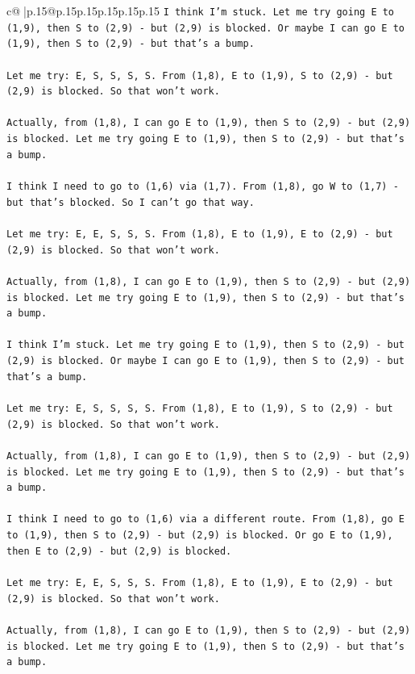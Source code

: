 \documentclass{article}
\begin{document}
{\begin{supertabular}{c@{$\;$}|p{.15\linewidth}@{}p{.15\linewidth}p{.15\linewidth}p{.15\linewidth}p{.15\linewidth}p{.15\linewidth}}
{{{\texttt{I think I'm stuck. Let me try going E to (1,9), then S to (2,9) {-} but (2,9) is blocked. Or maybe I can go E to (1,9), then S to (2,9) {-} but that's a bump.} \\
\\ 
\texttt{Let me try: E, S, S, S, S. From (1,8), E to (1,9), S to (2,9) {-} but (2,9) is blocked. So that won't work.} \\
\\ 
\texttt{Actually, from (1,8), I can go E to (1,9), then S to (2,9) {-} but (2,9) is blocked. Let me try going E to (1,9), then S to (2,9) {-} but that's a bump.} \\
\\ 
\texttt{I think I need to go to (1,6) via (1,7). From (1,8), go W to (1,7) {-} but that's blocked. So I can't go that way.} \\
\\ 
\texttt{Let me try: E, E, S, S, S. From (1,8), E to (1,9), E to (2,9) {-} but (2,9) is blocked. So that won't work.} \\
\\ 
\texttt{Actually, from (1,8), I can go E to (1,9), then S to (2,9) {-} but (2,9) is blocked. Let me try going E to (1,9), then S to (2,9) {-} but that's a bump.} \\
\\ 
\texttt{I think I'm stuck. Let me try going E to (1,9), then S to (2,9) {-} but (2,9) is blocked. Or maybe I can go E to (1,9), then S to (2,9) {-} but that's a bump.} \\
\\ 
\texttt{Let me try: E, S, S, S, S. From (1,8), E to (1,9), S to (2,9) {-} but (2,9) is blocked. So that won't work.} \\
\\ 
\texttt{Actually, from (1,8), I can go E to (1,9), then S to (2,9) {-} but (2,9) is blocked. Let me try going E to (1,9), then S to (2,9) {-} but that's a bump.} \\
\\ 
\texttt{I think I need to go to (1,6) via a different route. From (1,8), go E to (1,9), then S to (2,9) {-} but (2,9) is blocked. Or go E to (1,9), then E to (2,9) {-} but (2,9) is blocked.} \\
\\ 
\texttt{Let me try: E, E, S, S, S. From (1,8), E to (1,9), E to (2,9) {-} but (2,9) is blocked. So that won't work.} \\
\\ 
\texttt{Actually, from (1,8), I can go E to (1,9), then S to (2,9) {-} but (2,9) is blocked. Let me try going E to (1,9), then S to (2,9) {-} but that's a bump.} \\
}}}
\end{supertabular}}
\end{document}
